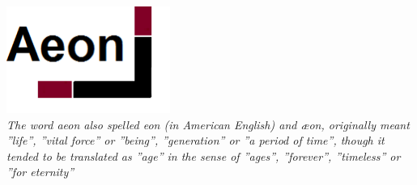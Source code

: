\vspace*{\fill}

\begin{minipage}{.85\linewidth}
\begin{center}

	\includegraphics[width=0.4\textwidth]{../Templates/Aeonbig.png}\\[2cm]
	
\emph{The word aeon also spelled eon (in American English) and æon, originally meant ''life'', ''vital force'' or ''being'', ''generation'' or ''a period of time'', though it tended to be translated as ''age'' in the sense of ''ages'', ''forever'', ''timeless'' or ''for eternity''} %

\end{center}
\end{minipage}
\vspace*{\fill}

\clearpage
